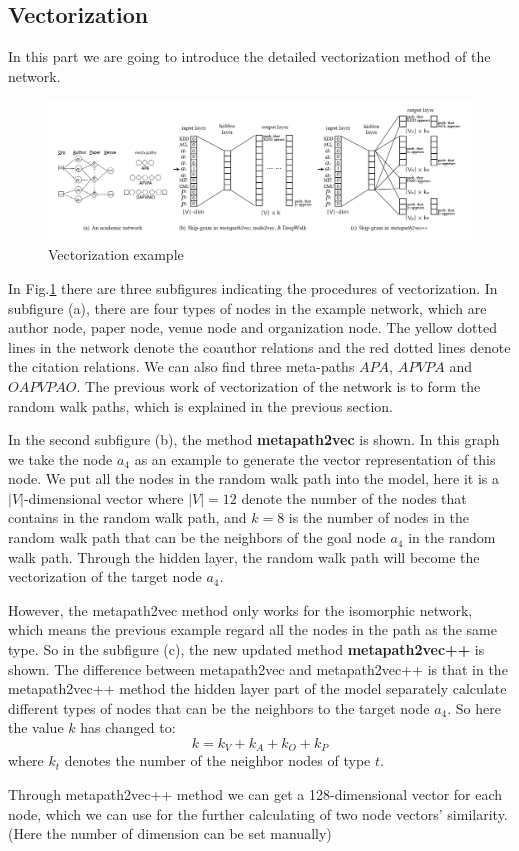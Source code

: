 \documentclass{acmtog} %
\begin{document}
\subsection{Vectorization}
In this part we are going to introduce the detailed vectorization method of the network.
\begin{figure}[ht]
  \centering
  \includegraphics[width=1\linewidth]{ve.png}
  \caption{Vectorization example}
  \label{5}
\end{figure}
\par In Fig.\ref{5} there are three subfigures indicating the procedures of vectorization. In subfigure (a), there are four types of nodes in the example network, which are author node, paper node, venue node and organization node. The yellow dotted lines in the network denote the coauthor relations and the red dotted lines denote the citation relations. We can also find three meta-paths $APA$, $APVPA$ and $OAPVPAO$. The previous work of vectorization of the network is to form the random walk paths, which is explained in the previous section.
\par In the second subfigure (b), the method \textbf{metapath2vec} is shown. In this graph we take the node $a_4$ as an example to generate the vector representation of this node. We put all the nodes in the random walk path into the model, here it is a $|V|$-dimensional vector where $|V| = 12$ denote the number of the nodes that contains in the random walk path, and $k = 8$ is the number of nodes in the random walk path that can be the neighbors of the goal node $a_4$ in the random walk path. Through the hidden layer, the random walk path will become the vectorization of the target node $a_4$.
\par However, the metapath2vec method only works for the isomorphic network, which means the previous example regard all the nodes in the path as the same type. So in the subfigure (c), the new updated method
\textbf{metapath2vec++} is shown. The difference between metapath2vec and metapath2vec++ is that in the metapath2vec++ method the hidden layer part of the model separately calculate different types of nodes that can be the neighbors to the target node $a_4$. So here the value $k$ has changed to:
$$k = k_V + k_A + k_O + k_P$$
where $k_t$ denotes the number of the neighbor nodes of type $t$.
\par Through metapath2vec++ method we can get a 128-dimensional vector for each node, which we can use for the further calculating of two node vectors' similarity. (Here the number of dimension can be set manually)
\end{document}
